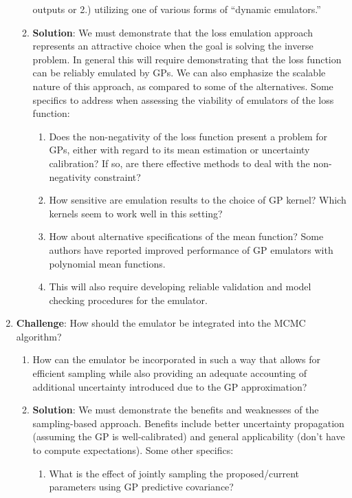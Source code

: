 \documentclass[12pt]{article}
\begin{document}
\begin{enumerate}
\begin{enumerate}
	outputs or 2.) utilizing one of various forms of ``dynamic emulators.''
	\item \textbf{Solution}: We must demonstrate that the loss emulation approach represents an attractive choice when the goal is solving the inverse problem. In general this will require demonstrating that
	the loss function can be reliably emulated by GPs. We can also emphasize the scalable nature of this approach, as compared to some of the alternatives. 
	Some specifics to address when assessing the viability of emulators of the loss function: 
		\begin{enumerate} 
		\item Does the non-negativity of the loss function present a problem for GPs, either with regard to its mean estimation or uncertainty calibration? If so, are there effective methods to deal with the non-negativity constraint? 
		\item How sensitive are emulation results to the choice of GP kernel? Which kernels seem to work well in this setting? 
		\item How about alternative specifications of the mean function? Some authors have reported improved performance of GP emulators with polynomial mean functions. 
		\item This will also require developing reliable validation and model checking procedures for the emulator. 
		\end{enumerate}
	\end{enumerate}
\item \textbf{Challenge}: How should the emulator be integrated into the MCMC algorithm? 
	\begin{enumerate}
	\item How can the emulator be incorporated in such a way that allows for efficient sampling while also providing an adequate accounting of additional uncertainty introduced due to the GP 
	approximation? 
	\item \textbf{Solution}: We must demonstrate the benefits and weaknesses of the sampling-based approach. Benefits include better uncertainty propagation (assuming the GP is well-calibrated) 
	and general applicability (don't have to compute expectations). Some other specifics: 
		\begin{enumerate} 
		\item What is the effect of jointly sampling the proposed/current parameters using GP predictive covariance?
		\end{enumerate} 
	\end{enumerate}

\end{enumerate}
\end{document}
